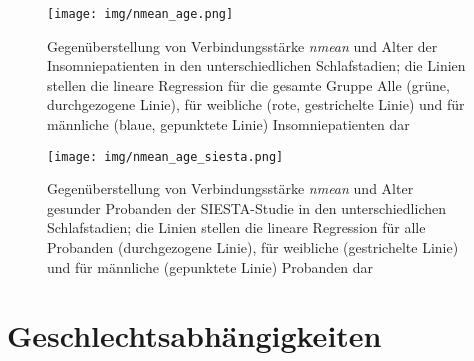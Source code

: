 \newpage

\begin{figure}[H]
	\centering
	\texttt{[image: img/nmean\_age.png]}
	\caption[Gegenüberstellung von Verbindungsstärke \textit{nmean} und Alter von Insomniepatienten]{Gegenüberstellung von Verbindungsstärke \textit{nmean} und Alter der Insomniepatienten in den unterschiedlichen Schlafstadien; die Linien stellen die lineare Regression für die gesamte Gruppe Alle (grüne, durchgezogene Linie), für weibliche (rote, gestrichelte Linie) und für männliche (blaue, gepunktete Linie) Insomniepatienten dar}
	\label{fig:nmean_age}
\end{figure}


\begin{figure}[H]
	\centering
	\texttt{[image: img/nmean\_age\_siesta.png]}
	\caption[Gegenüberstellung von Verbindungsstärke \textit{nmean} und Alter gesunder Probanden]{Gegenüberstellung von Verbindungsstärke \textit{nmean} und Alter gesunder Probanden der SIESTA-Studie in den unterschiedlichen Schlafstadien; die Linien stellen die lineare Regression für alle Probanden (durchgezogene Linie), für weibliche (gestrichelte Linie) und für männliche (gepunktete Linie) Probanden dar}
	\label{fig:nmean_age_siesta}
\end{figure}

\section{Geschlechtsabhängigkeiten}